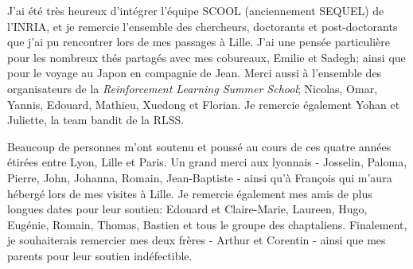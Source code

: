 J'ai été très heureux d'intégrer l'équipe SCOOL (anciennement SEQUEL) de l'INRIA, et je remercie l'ensemble des chercheurs, doctorants et post-doctorants que j'ai pu rencontrer lors de mes passages à Lille. J'ai une pensée particulière pour les nombreux thés partagés avec mes cobureaux, Emilie et Sadegh; ainsi que pour le voyage au Japon en compagnie de Jean. Merci aussi à l'ensemble des organisateurs de la \emph{Reinforcement Learning Summer School}; Nicolas, Omar, Yannis, Edouard, Mathieu, Xuedong et Florian. Je remercie également Yohan et Juliette, la team bandit de la RLSS.

Beaucoup de personnes m'ont soutenu et poussé au cours de ces quatre années étirées entre Lyon, Lille et Paris. Un grand merci aux lyonnais - Josselin, Paloma, Pierre, John, Johanna, Romain, Jean-Baptiste - ainsi qu'à François qui m'aura hébergé lors de mes visites à Lille. Je remercie également mes amis de plus longues dates pour leur soutien: Edouard et Claire-Marie, Laureen, Hugo, Eugénie, Romain, Thomas, Bastien et tous le groupe des chaptaliens.  Finalement, je souhaiterais remercier mes deux frères - Arthur et Corentin - ainsi que mes parents pour leur soutien indéfectible. 

\cleardoublepage